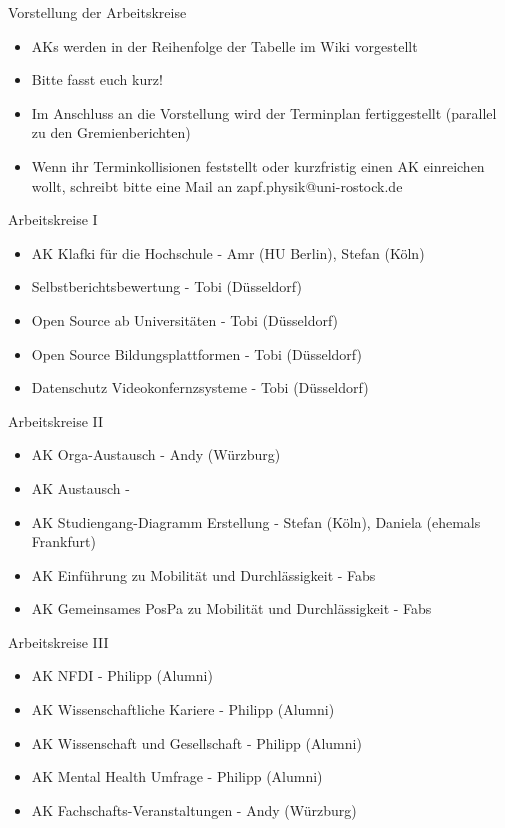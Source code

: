 \begin{frame}{Vorstellung der Arbeitskreise}
	\begin{itemize}
		\item AKs werden in der Reihenfolge der Tabelle im Wiki vorgestellt
		\item Bitte fasst euch kurz!
		\item Im Anschluss an die Vorstellung wird der Terminplan fertiggestellt (parallel zu den Gremienberichten)
		\item Wenn ihr Terminkollisionen feststellt oder kurzfristig einen AK einreichen wollt, schreibt bitte eine Mail an zapf.physik@uni-rostock.de
	\end{itemize}
\end{frame}

\begin{frame}{Arbeitskreise I}
	\begin{itemize}
		\item AK Klafki für die Hochschule - Amr (HU Berlin), Stefan (Köln)
		\item Selbstberichtsbewertung - Tobi (Düsseldorf)
		\item Open Source ab Universitäten - Tobi (Düsseldorf)
		\item Open Source Bildungsplattformen - Tobi (Düsseldorf)
		\item Datenschutz Videokonfernzsysteme - Tobi (Düsseldorf)
	\end{itemize}
\end{frame}

\begin{frame}{Arbeitskreise II}
	\begin{itemize}
		\item AK Orga-Austausch - Andy (Würzburg)
		\item AK Austausch - 
		\item AK Studiengang-Diagramm Erstellung - Stefan (Köln), Daniela (ehemals Frankfurt)
		\item AK Einführung zu Mobilität und Durchlässigkeit - Fabs
		\item AK Gemeinsames PosPa zu Mobilität und Durchlässigkeit -  Fabs
	\end{itemize}
\end{frame}

\begin{frame}{Arbeitskreise III}
	\begin{itemize}
		\item AK NFDI - Philipp (Alumni)
		\item AK Wissenschaftliche Kariere - Philipp (Alumni)
		\item AK Wissenschaft und Gesellschaft - Philipp (Alumni)
		\item AK Mental Health Umfrage - Philipp (Alumni)
		\item AK Fachschafts-Veranstaltungen - Andy (Würzburg)
	\end{itemize}
\end{frame}

